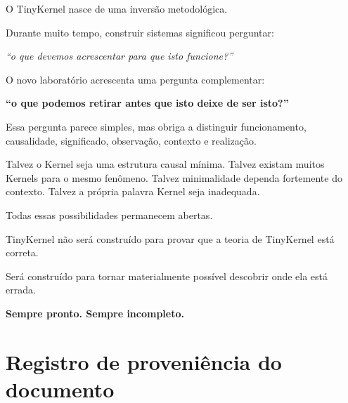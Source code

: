\documentclass[11pt,a4paper]{article}
\begin{document}
O TinyKernel nasce de uma inversão metodológica.

Durante muito tempo, construir sistemas significou perguntar:

\begin{center}
\emph{“o que devemos acrescentar para que isto funcione?”}
\end{center}

O novo laboratório acrescenta uma pergunta complementar:

\begin{center}
\Large\bfseries
“o que podemos retirar antes que isto deixe de ser isto?”
\end{center}

Essa pergunta parece simples, mas obriga a distinguir funcionamento, causalidade,
significado, observação, contexto e realização.

Talvez o Kernel seja uma estrutura causal mínima.
Talvez existam muitos Kernels para o mesmo fenômeno.
Talvez minimalidade dependa fortemente do contexto.
Talvez a própria palavra Kernel seja inadequada.

Todas essas possibilidades permanecem abertas.

\begin{thesisbox}
TinyKernel não será construído para provar que a teoria de TinyKernel está correta.

Será construído para tornar materialmente possível descobrir onde ela está errada.
\end{thesisbox}

\vspace{0.8cm}

\begin{center}
{\sffamily\Large\bfseries\color{TKBlue}
Sempre pronto. Sempre incompleto.}
\end{center}

\appendix

\section{Registro de proveniência do documento}
\end{document}
